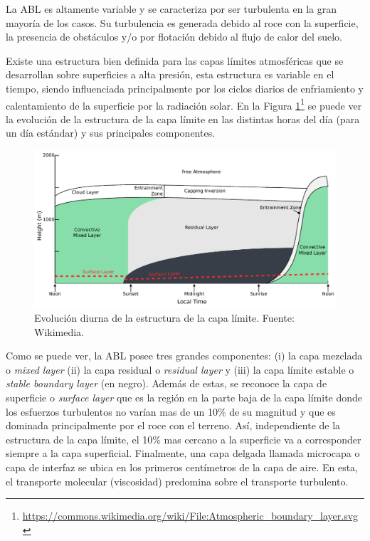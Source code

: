 La ABL es altamente variable y se caracteriza por ser turbulenta en la gran mayoría de los casos. Su turbulencia es generada debido al roce con la superficie, la presencia de obstáculos y/o por flotación debido al flujo de calor del suelo. 

Existe una estructura bien definida para las capas límites atmosféricas que se desarrollan sobre superficies a alta presión, esta estructura es variable en el tiempo, siendo influenciada principalmente por los ciclos diarios de enfriamiento y calentamiento de la superficie por la radiación solar. En la Figura \ref{fig:03_abl}\footnote{\url{https://commons.wikimedia.org/wiki/File:Atmospheric\_boundary\_layer.svg}} se puede ver la evolución de la estructura de la capa límite en las distintas horas del día (para un día estándar) y sus principales componentes.

\begin{figure}[h!]
	\centering
	\includegraphics[width=0.98\linewidth,trim={0cm 0cm 0cm 0cm},clip]{Imagenes/03/abl}
	\caption{Evolución diurna de la estructura de la capa límite. Fuente: Wikimedia.}
	\label{fig:03_abl}
\end{figure}

Como se puede ver, la ABL posee tres grandes componentes: (i) la capa mezclada o \emph{mixed layer} (ii) la capa residual o \emph{residual layer} y (iii) la capa límite estable o \emph{stable boundary layer} (en negro). Además de estas, se reconoce la capa de superficie o \emph{surface layer} que es la región en la parte baja de la capa límite donde los esfuerzos turbulentos no varían mas de un 10\% de su magnitud y que es dominada principalmente por el roce con el terreno. Así, independiente de la estructura de la capa límite, el 10\% mas cercano a la superficie va a corresponder siempre a la capa superficial. Finalmente, una capa delgada llamada microcapa o capa de interfaz se ubica en los primeros centímetros de la capa de aire. En esta, el transporte molecular (viscosidad) predomina sobre el transporte turbulento.

